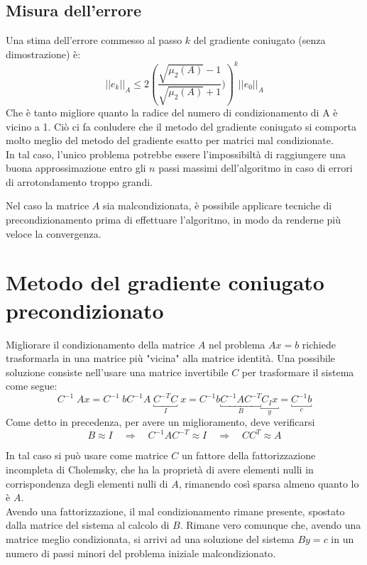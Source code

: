 \subsection{Misura dell'errore} Una stima dell'errore commesso al
passo $k$ del gradiente coniugato (senza dimostrazione) \`e:
$$
||e_{k}||_{A} \leq 2 \left( \frac{
\sqrt{\mu_{2}(A)}-1}{\sqrt{\mu_{2}(A)}+1} {)} \right)^{k}
||e_{0}||_{A}
$$
Che \`e tanto migliore quanto la radice del numero di condizionamento di
A \`e vicino a 1. Ciò ci fa conludere che il metodo del gradiente
coniugato si comporta molto meglio del metodo del gradiente esatto per
matrici mal condizionate.\\ In tal caso, l'unico problema potrebbe
essere l'impossibiltà di raggiungere una buona approssimazione entro
gli $n$ passi massimi dell'algoritmo in caso di errori di
arrotondamento troppo grandi.

Nel caso la matrice $A$ sia malcondizionata, \`e possibile applicare
tecniche di precondizionamento prima di effettuare l'algoritmo, in
modo da renderne più veloce la convergenza.
 
\section{Metodo del gradiente coniugato precondizionato} Migliorare il
condizionamento della matrice $A$ nel problema $Ax=b$ richiede
trasformarla in una matrice più "vicina" alla matrice identità. Una
possibile soluzione consiste nell'usare una matrice invertibile $C$
per trasformare il sistema come segue:
$$
C^{-1}\; Ax = C^{-1}\; b C^{-1}A \; \underbracket{C^{-T}C}_{I} \; x =
C^{-1}b \underbracket{C^{-1}AC^{-T}}_{B} \underbracket{C_{I} x}_{y} =
\underbracket{C^{-1}b}_{c}
$$
Come detto in precedenza, per avere un miglioramento, deve verificarsi
$$
B \approx I \quad \Longrightarrow \quad C^{-1}AC^{-T} \approx I \quad
\Longrightarrow \quad CC^{T} \approx A
$$

In tal caso si può usare come matrice $C$ un fattore della
fattorizzazione incompleta di Cholemsky, che ha la proprietà di avere
elementi nulli in corrispondenza degli elementi nulli di $A$,
rimanendo così sparsa almeno quanto lo \`e $A$. \\ Avendo una
fattorizzazione, il mal condizionamento rimane presente, spostato
dalla matrice del sistema al calcolo di $B$.  Rimane vero comunque
che, avendo una matrice meglio condizionata, si arrivi ad una
soluzione del sistema $By=c$ in un numero di passi minori del problema
iniziale malcondizionato.

